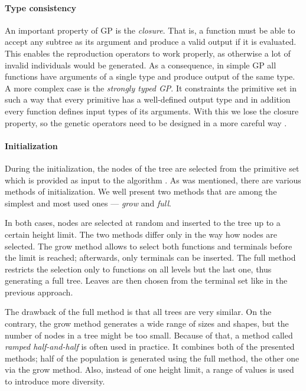 \paragraph{Type consistency}
An important property of GP is the \emph{closure}. That is, a function must
be able to accept any subtree as its argument and produce a valid output if
it is evaluated. This enables the reproduction operators to work properly, as
otherwise a lot of invalid individuals would be generated. As a consequence,
in simple GP all functions have arguments of a single type and produce output
of the same type. A more complex case is the \emph{strongly typed GP}. It
constraints the primitive set in such a way that every primitive has a
well-defined output type and in addition every function defines input types of
its arguments. With this we lose the closure property, so the genetic operators
need to be designed in a more careful way \citep[p.~21]{Poli:2008:FGG:1796422}.

\paragraph{Initialization}
During the initialization, the nodes of the tree are selected from the
primitive set which is provided as input to the algorithm
\citep{Koza:1992:GPP:138936}. As was mentioned, there are various methods of 
initialization. We well present two methods that are among the simplest and 
most used ones --- \emph{grow} and \emph{full}.

In both cases, nodes are selected at random and inserted to the tree up to a
certain height limit. The two methods differ only in the way how nodes are
selected. The grow method allows to select both functions and terminals
before the limit is reached; afterwards, only terminals can be inserted. The
full method restricts the selection only to functions on all levels but the
last one, thus generating a full tree. Leaves are then chosen from the terminal
set like in the previous approach.

The drawback of the full method is that all trees are very similar. On the
contrary, the grow method generates a wide range of sizes and shapes, but the
number of nodes in a tree might be too small. Because of that, a method called
\emph{ramped half-and-half} is often used in practice. It combines both 
of the presented methods; half of the population is generated using the full
method, the other one via the grow method. Also, instead of one height limit, a
range of values is used to introduce more diversity.
\citep{Poli:2008:FGG:1796422}

